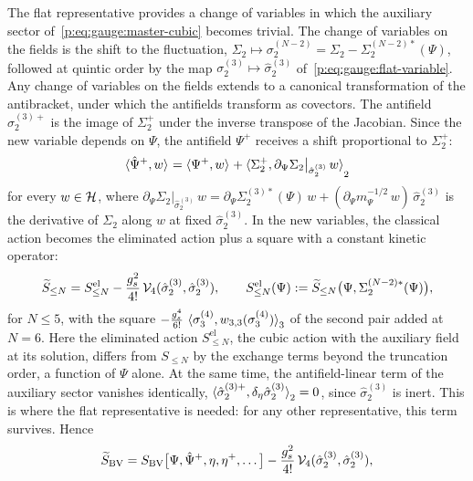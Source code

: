The flat representative provides a change of variables in which the auxiliary sector of~\eqref{p:eq:gauge:master-cubic} becomes trivial.
The change of variables on the fields is the shift to the fluctuation, $\Sigma_2 \mapsto \sigma_2^{(N-2)} = \Sigma_2 - \Sigma_2^{(N-2)*}(\Psi)$, followed at quintic order by the map $\sigma_2^{(3)} \mapsto \hat\sigma_2^{(3)}$ of~\eqref{p:eq:gauge:flat-variable}.
Any change of variables on the fields extends to a canonical transformation of the antibracket, under which the antifields transform as covectors.
The antifield $\hat\sigma_2^{(3)+}$ is the image of $\Sigma_2^+$ under the inverse transpose of the Jacobian.
  Since the new variable depends on $\Psi$, the antifield $\Psi^+$ receives a shift proportional to $\Sigma_2^+$:
\begin{equation}
  \label{p:eq:gauge:antifield-shift}
  \pair{\hat \Psi^+}{w}
    = \pair{\Psi^+}{w} + \pair[2]{\Sigma_2^+}{\partial_\Psi \Sigma_2 \big\vert_{\hat\sigma_2^{(3)}} \, w}
\end{equation}
for every $w \in \Hs$, where $\partial_\Psi \Sigma_2 \vert_{\hat\sigma_2^{(3)}} \, w = \partial_\Psi \Sigma_2^{(3)*}(\Psi) \, w + (\partial_\Psi m_\Psi^{-1/2} \, w) \, \hat\sigma_2^{(3)}$ is the derivative of $\Sigma_2$ along $w$ at fixed $\hat\sigma_2^{(3)}$.
In the new variables, the classical action becomes the eliminated action plus a square with a constant kinetic operator:
\begin{equation}
  \label{p:eq:gauge:S-el}
  \caction[\le N]
    = S^{\mathrm{el}}_{\le N} - \frac{\gs^2}{4!} \, \vertex{4}(\hat\sigma_2^{(3)}, \hat\sigma_2^{(3)}),
  \qquad
  S^{\mathrm{el}}_{\le N}(\Psi)
    := \caction[\le N] \big( \Psi, \Sigma_2^{(N-2)*}(\Psi) \big),
\end{equation}
for $N \le 5$, with the square $- \tfrac{\gs^4}{6!} \, \pair[3]{\sigma_3^{(4)}}{\wprod{3}{3}(\sigma_3^{(4)})}$ of the second pair added at $N = 6$.
Here the eliminated action $S^{\mathrm{el}}_{\le N}$, the cubic action with the auxiliary field at its solution, differs from $S_{\le N}$ by the exchange terms beyond the truncation order, a function of $\Psi$ alone.
At the same time, the antifield-linear term of the auxiliary sector vanishes identically, $\pair[2]{\hat\sigma_2^{(3)+}}{\delta_\eta \hat\sigma_2^{(3)}} = 0$, since $\hat\sigma_2^{(3)}$ is inert.
  This is where the flat representative is needed: for any other representative, this term survives.
Hence
\begin{equation}
  \label{p:eq:gauge:master-hatted}
  \caction[\mathrm{BV}]
    = S_{\mathrm{BV}}\big[\Psi, \hat \Psi^+, \eta, \eta^+, \ldots\big]
      - \frac{\gs^2}{4!} \, \vertex{4}(\hat\sigma_2^{(3)}, \hat\sigma_2^{(3)}),
\end{equation}
